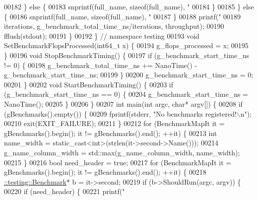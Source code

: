 \begin{DoxyCode}
{{{{{{00182     \} \textcolor{keywordflow}{else} \{
00183       snprintf(full\_name, \textcolor{keyword}{sizeof}(full\_name), \textcolor{stringliteral}{"%
00184     \}
00185   \} \textcolor{keywordflow}{else} \{
00186     snprintf(full\_name, \textcolor{keyword}{sizeof}(full\_name), \textcolor{stringliteral}{"%
00187   \}
00188   printf(\textcolor{stringliteral}{"%
00189          iterations, g\_benchmark\_total\_time\_ns/iterations, throughput);
00190   fflush(stdout);
00191 \}
00192 \}  \textcolor{comment}{// namespace testing}
00193 \textcolor{keywordtype}{void} SetBenchmarkFlopsProcessed(int64\_t x) \{
00194   g\_flops\_processed = x;
00195 \}
00196 \textcolor{keywordtype}{void} StopBenchmarkTiming() \{
00197   \textcolor{keywordflow}{if} (g\_benchmark\_start\_time\_ns != 0) \{
00198     g\_benchmark\_total\_time\_ns += NanoTime() - g\_benchmark\_start\_time\_ns;
00199   \}
00200   g\_benchmark\_start\_time\_ns = 0;
00201 \}
00202 \textcolor{keywordtype}{void} StartBenchmarkTiming() \{
00203   \textcolor{keywordflow}{if} (g\_benchmark\_start\_time\_ns == 0) \{
00204     g\_benchmark\_start\_time\_ns = NanoTime();
00205   \}
00206 \}
00207 \textcolor{keywordtype}{int} main(\textcolor{keywordtype}{int} argc, \textcolor{keywordtype}{char}* argv[]) \{
00208   \textcolor{keywordflow}{if} (gBenchmarks().empty()) \{
00209     fprintf(stderr, \textcolor{stringliteral}{"No benchmarks registered!\(\backslash\)n"});
00210     exit(EXIT\_FAILURE);
00211   \}
00212   \textcolor{keywordflow}{for} (BenchmarkMapIt it = gBenchmarks().begin(); it != gBenchmarks().end(); ++it) \{
00213     \textcolor{keywordtype}{int} name\_width = \textcolor{keyword}{static\_cast<}\textcolor{keywordtype}{int}\textcolor{keyword}{>}(strlen(it->second->Name()));
00214     g\_name\_column\_width = std::max(g\_name\_column\_width, name\_width);
00215   \}
00216   \textcolor{keywordtype}{bool} need\_header = \textcolor{keyword}{true};
00217   \textcolor{keywordflow}{for} (BenchmarkMapIt it = gBenchmarks().begin(); it != gBenchmarks().end(); ++it) \{
00218     \hyperlink{classtesting_1_1_benchmark}{::testing::Benchmark}* b = it->second;
00219     \textcolor{keywordflow}{if} (b->ShouldRun(argc, argv)) \{
00220       \textcolor{keywordflow}{if} (need\_header) \{
00221         printf(\textcolor{stringliteral}{"%
}}}}}}}}}}
\end{DoxyCode}
